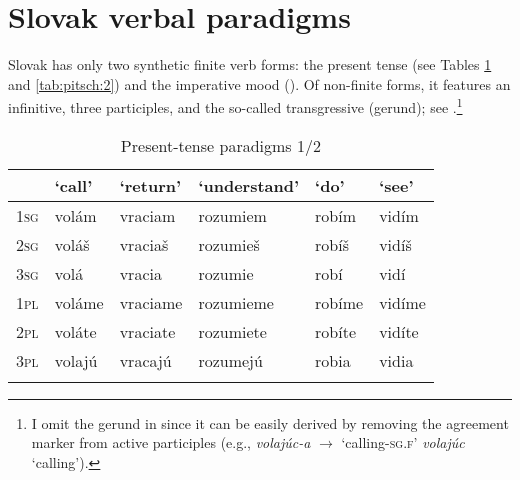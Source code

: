 \documentclass[output=paper,colorlinks,citecolor=brown,
]{langscibook}
\begin{document}

\section{Slovak verbal paradigms}\label{sec:SlovakVerbs}

Slovak has only two synthetic finite verb forms: the present tense (see Tables \ref{tab:pitsch:1} and \ref{tab:pitsch:2}) and the imperative mood (). Of non-finite forms, it features an infinitive, three participles, and the so-called transgressive (gerund); see .\footnote{I omit the gerund in  since it can be easily derived by removing the agreement marker from active participles (e.g., \textit{volajúc-a} $\rightarrow$ `calling-\textsc{sg.f}' \textit{volajúc} `calling').}


\begin{table}[H]
\caption{Present-tense paradigms 1/2}
\label{tab:pitsch:1}
 \begin{tabular}{llllll}
  \lsptoprule
            & `call' & `return' & `understand' & `do' & `see' \\
  \midrule
  \textsc{1sg} & volám & vraciam & rozumiem & robím & vidím \\
  \textsc{2sg} & voláš & vraciaš & rozumieš & robíš & vidíš \\
  \textsc{3sg} & volá & vracia & rozumie & robí & vidí \\
  \textsc{1pl} & voláme & vraciame & rozumieme & robíme & vidíme \\
  \textsc{2pl} & voláte & vraciate & rozumiete & robíte & vidíte \\
  \textsc{3pl} & volajú & vracajú & rozumejú & robia & vidia \\
  \lspbottomrule
 \end{tabular}
\end{table}

\end{document}
